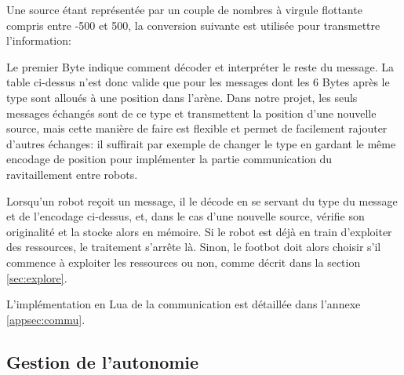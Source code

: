 Une source étant représentée par un couple de nombres à virgule flottante compris entre -500 et 500, la conversion suivante est utilisée pour transmettre l'information:

\vspace{1em}

\vspace{1em}

Le premier Byte indique comment décoder et interpréter le reste du message. La table ci-dessus n'est donc valide que pour les messages dont les 6 Bytes après le type sont alloués à une position dans l'arène. Dans notre projet, les seuls messages échangés sont de ce type et transmettent la position d'une nouvelle source, mais cette manière de faire est flexible et permet de facilement rajouter d'autres échanges: il suffirait par exemple de changer le type en gardant le même encodage de position pour implémenter la partie communication du ravitaillement entre robots.

Lorsqu'un robot reçoit un message, il le décode en se servant du type du message et de l'encodage ci-dessus, et, dans le cas d'une nouvelle source, vérifie son originalité et la stocke alors en mémoire. Si le robot est déjà en train d'exploiter des ressources, le traitement s'arrête là. Sinon, le footbot doit alors choisir s'il commence à exploiter les ressources ou non, comme décrit dans la section \ref{sec:explore}.

L'implémentation en Lua de la communication est détaillée dans l'annexe \ref{appsec:commu}.

\subsection{Gestion de l'autonomie}

